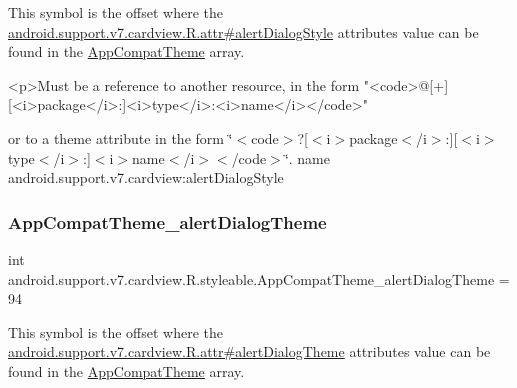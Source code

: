 This symbol is the offset where the \hyperlink{classandroid_1_1support_1_1v7_1_1cardview_1_1R_1_1attr_a0d798a0d9dc93b5d065cce12a60d5a02}{android.\+support.\+v7.\+cardview.\+R.\+attr\#alert\+Dialog\+Style} attribute\textquotesingle{}s value can be found in the \hyperlink{classandroid_1_1support_1_1v7_1_1cardview_1_1R_1_1styleable_a52e6f69f954ecc2622d72c0b4d298938}{App\+Compat\+Theme} array.

\begin{DoxyVerb}      <p>Must be a reference to another resource, in the form "<code>@[+][<i>package</i>:]<i>type</i>:<i>name</i></code>"
\end{DoxyVerb}
 or to a theme attribute in the form \char`\"{}$<$code$>$?\mbox{[}$<$i$>$package$<$/i$>$\+:\mbox{]}\mbox{[}$<$i$>$type$<$/i$>$\+:\mbox{]}$<$i$>$name$<$/i$>$$<$/code$>$\char`\"{}.  name android.\+support.\+v7.\+cardview\+:alert\+Dialog\+Style \mbox{\label{classandroid_1_1support_1_1v7_1_1cardview_1_1R_1_1styleable_acfcfac63c3692a282515b5e87698c92f}} 
\subsubsection{\texorpdfstring{App\+Compat\+Theme\+\_\+alert\+Dialog\+Theme}{AppCompatTheme\_alertDialogTheme}}
{\footnotesize\ttfamily int android.\+support.\+v7.\+cardview.\+R.\+styleable.\+App\+Compat\+Theme\+\_\+alert\+Dialog\+Theme = 94\hspace{0.3cm}{\ttfamily [static]}}

This symbol is the offset where the \hyperlink{classandroid_1_1support_1_1v7_1_1cardview_1_1R_1_1attr_a9c69f1c157431fd550f9dea2ab773ad5}{android.\+support.\+v7.\+cardview.\+R.\+attr\#alert\+Dialog\+Theme} attribute\textquotesingle{}s value can be found in the \hyperlink{classandroid_1_1support_1_1v7_1_1cardview_1_1R_1_1styleable_a52e6f69f954ecc2622d72c0b4d298938}{App\+Compat\+Theme} array.

